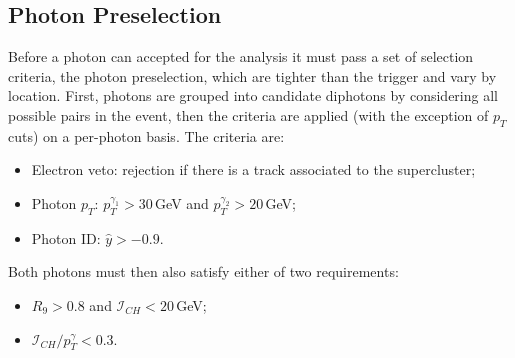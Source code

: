 


\subsection{Photon Preselection}
Before a photon can accepted for the \Hgg analysis it must pass a set of selection criteria, the photon preselection, which are tighter than the trigger and vary by location. First, photons are grouped into candidate diphotons by considering all possible pairs in the event, then the criteria are applied (with the exception of $p_{T}$ cuts) on a per-photon basis.
The criteria are:
\begin{itemize}[noitemsep]
    \item Electron veto: rejection if there is a track associated to the supercluster;
    \item Photon $p_{T}$: $p_{T}^{\gamma_1} > 30$\,GeV and $p_{T}^{\gamma_2} > 20$\,GeV;
    \item Photon ID: $\hat{y}>-0.9$.
\end{itemize}
Both photons must then also satisfy either of two requirements:
\begin{itemize}[noitemsep]
    \item $R_{9} > 0.8$ and $\mathcal{I}_{CH} < 20$\,GeV;
    \item $\mathcal{I}_{CH}/p_{T}^{\gamma} < 0.3$.
\end{itemize}
